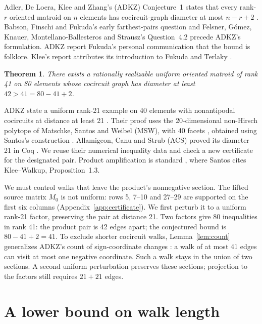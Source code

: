 \documentclass[11pt]{article}
\newtheorem{theorem}{Theorem}
\theoremstyle{remark}
\begin{document}
Adler, De Loera, Klee and Zhang's (ADKZ) Conjecture~1 states that every rank-$r$ oriented matroid on
$n$ elements has cocircuit-graph diameter at most $n-r+2$
\cite[Conjecture~1]{adkz}. Babson, Finschi and Fukuda's early
farthest-pairs question \cite[final remarks, pp.~13--14]{bff} and
Felsner, G\'omez, Knauer, Montellano-Ballesteros and Strausz's
Question~4.2 \cite{felsner} precede ADKZ's formulation. ADKZ report Fukuda's personal communication
that the bound is folklore. Klee's report attributes its introduction
to Fukuda and Terlaky \cite[p.~2425]{klee}.

\begin{theorem}\label{thm:main}
There exists a rationally realizable uniform oriented matroid of rank 41
on 80 elements whose cocircuit graph has diameter at least
$42>41=80-41+2$.
\end{theorem}

ADKZ state a uniform rank-21 example on 40 elements with nonantipodal
cocircuits at distance at least 21 \cite[Proposition~8]{adkz}.
Their proof uses the 20-dimensional non-Hirsch polytope of Matschke,
Santos and Weibel (MSW), with 40 facets
\cite[Theorem~1.3]{msw}, obtained using Santos's construction
\cite[Theorem~2.6]{santos}. Allamigeon, Canu and Strub (ACS) proved
its diameter 21 in Coq \cite[\S5, PDF p.~12]{acs}.
We reuse their numerical inequality data and check a new certificate for
the designated pair. Product amplification is standard
\cite[Lemma~6.1 and \S6]{santos}, where Santos cites Klee--Walkup,
Proposition~1.3.

We must control walks that leave the product's nonnegative section.
The lifted source matrix $M_0$ is not uniform: rows 5, 7--10 and 27--29
are supported on the first six columns (Appendix~\ref{app:certificate}).
We first perturb it to a uniform rank-21 factor, preserving
the pair at distance 21. Two factors give 80 inequalities in rank 41:
the product pair is 42 edges apart; the conjectured bound is
$80-41+2=41$. To exclude shorter cocircuit walks,
Lemma~\ref{lem:count} generalizes ADKZ's count of sign-coordinate changes
\cite[Lemma~5 and proof of Proposition~8]{adkz}: a walk of at most 41
edges can visit at most one negative coordinate. Such a walk stays in
the union of two sections. A second uniform perturbation preserves
these sections; projection to the factors still requires $21+21$ edges.

\section{A lower bound on walk length}
\end{document}
